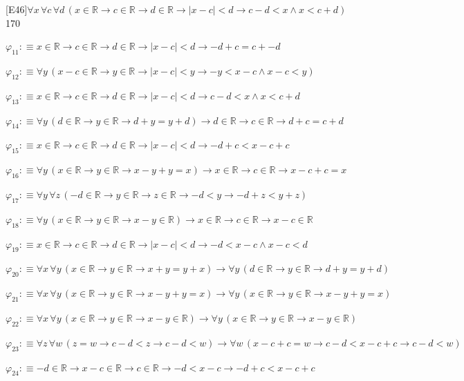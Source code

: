 \begin{fullproof}{[E46]}{$\forall x\,\forall c\,\forall d\,(x \in \mathbb{R} \to c \in \mathbb{R} \to d \in \mathbb{R} \to \lvert x - c \rvert < d \to c - d < x \land x < c + d)$}{170}
\begin{abbrevlist}
\item $\varphi_{11} :\equiv x \in \mathbb{R} \to c \in \mathbb{R} \to d \in \mathbb{R} \to \lvert x - c \rvert < d \to -d + c = c + -d$
\item $\varphi_{12} :\equiv \forall y\,(x - c \in \mathbb{R} \to y \in \mathbb{R} \to \lvert x - c \rvert < y \to -y < x - c \land x - c < y)$
\item $\varphi_{13} :\equiv x \in \mathbb{R} \to c \in \mathbb{R} \to d \in \mathbb{R} \to \lvert x - c \rvert < d \to c - d < x \land x < c + d$
\item $\varphi_{14} :\equiv \forall y\,(d \in \mathbb{R} \to y \in \mathbb{R} \to d + y = y + d) \to d \in \mathbb{R} \to c \in \mathbb{R} \to d + c = c + d$
\item $\varphi_{15} :\equiv x \in \mathbb{R} \to c \in \mathbb{R} \to d \in \mathbb{R} \to \lvert x - c \rvert < d \to -d + c < x - c + c$
\item $\varphi_{16} :\equiv \forall y\,(x \in \mathbb{R} \to y \in \mathbb{R} \to x - y + y = x) \to x \in \mathbb{R} \to c \in \mathbb{R} \to x - c + c = x$
\item $\varphi_{17} :\equiv \forall y\,\forall z\,(-d \in \mathbb{R} \to y \in \mathbb{R} \to z \in \mathbb{R} \to -d < y \to -d + z < y + z)$
\item $\varphi_{18} :\equiv \forall y\,(x \in \mathbb{R} \to y \in \mathbb{R} \to x - y \in \mathbb{R}) \to x \in \mathbb{R} \to c \in \mathbb{R} \to x - c \in \mathbb{R}$
\item $\varphi_{19} :\equiv x \in \mathbb{R} \to c \in \mathbb{R} \to d \in \mathbb{R} \to \lvert x - c \rvert < d \to -d < x - c \land x - c < d$
\item $\varphi_{20} :\equiv \forall x\,\forall y\,(x \in \mathbb{R} \to y \in \mathbb{R} \to x + y = y + x) \to \forall y\,(d \in \mathbb{R} \to y \in \mathbb{R} \to d + y = y + d)$
\item $\varphi_{21} :\equiv \forall x\,\forall y\,(x \in \mathbb{R} \to y \in \mathbb{R} \to x - y + y = x) \to \forall y\,(x \in \mathbb{R} \to y \in \mathbb{R} \to x - y + y = x)$
\item $\varphi_{22} :\equiv \forall x\,\forall y\,(x \in \mathbb{R} \to y \in \mathbb{R} \to x - y \in \mathbb{R}) \to \forall y\,(x \in \mathbb{R} \to y \in \mathbb{R} \to x - y \in \mathbb{R})$
\item $\varphi_{23} :\equiv \forall z\,\forall w\,(z = w \to c - d < z \to c - d < w) \to \forall w\,(x - c + c = w \to c - d < x - c + c \to c - d < w)$
\item $\varphi_{24} :\equiv -d \in \mathbb{R} \to x - c \in \mathbb{R} \to c \in \mathbb{R} \to -d < x - c \to -d + c < x - c + c$

\end{abbrevlist}
\end{fullproof}
